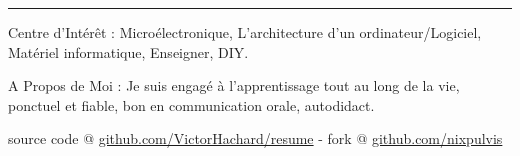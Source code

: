 \documentclass[10pt,letterpaper]{article}
\newenvironment{indentsection}[1]
{\begin{list}{}
  {\setlength{\leftmargin}{#1}} \item[]
}
{\end{list}}
\begin{document}
\hrule
\begin{indentsection}{\parindent}
\begin{description*}
\item[Centre d'Intérêt :]
  Microélectronique, L'architecture d'un ordinateur/Logiciel, Matériel
  informatique, Enseigner, DIY.
\item[A Propos de Moi :]
  Je suis engagé à l'apprentissage tout au long de la vie, ponctuel et fiable,
  bon en communication orale, autodidact.
\end{description*}
\end{indentsection}


\begin{center}
\footnotesize source code @
\href{http://www.github.com/VictorHachard/resume}
{github.com/VictorHachard/resume} - fork @
\href{http://www.github.com/nixpulvis}
{github.com/nixpulvis}
\end{center}
\end{document}
